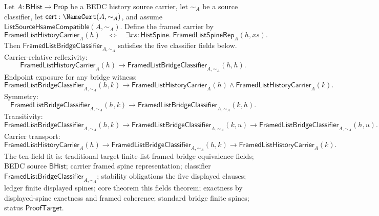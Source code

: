 \begin{theorem}
\label{thm:framed-list-bridge-classifier-equivalence-fields}
Let $A:\mathsf{BHist}\to\mathsf{Prop}$ be a BEDC history source carrier, let
$\sim_A$ be a source classifier, let $\mathsf{cert}:\NameCert(A,\sim_A)$, and
assume $\mathsf{ListSourceHsameCompatible}(A,\sim_A)$. Define the framed carrier
by
$$
\mathsf{FramedListHistoryCarrier}_A(h)
\quad\Longleftrightarrow\quad
\exists xs:\mathsf{HistSpine}.\;\mathsf{FramedListSpineRep}_A(h,xs).
$$
Then $\mathsf{FramedListBridgeClassifier}_{A,\sim_A}$ satisfies the five
classifier fields below. Carrier-relative reflexivity:
$$
\mathsf{FramedListHistoryCarrier}_A(h)\to
\mathsf{FramedListBridgeClassifier}_{A,\sim_A}(h,h).
$$
Endpoint exposure for any bridge witness:
$$
\mathsf{FramedListBridgeClassifier}_{A,\sim_A}(h,k)\to
\mathsf{FramedListHistoryCarrier}_A(h)\land
\mathsf{FramedListHistoryCarrier}_A(k).
$$
Symmetry:
$$
\mathsf{FramedListBridgeClassifier}_{A,\sim_A}(h,k)\to
\mathsf{FramedListBridgeClassifier}_{A,\sim_A}(k,h).
$$
Transitivity:
$$
\mathsf{FramedListBridgeClassifier}_{A,\sim_A}(h,k)\to
\mathsf{FramedListBridgeClassifier}_{A,\sim_A}(k,u)\to
\mathsf{FramedListBridgeClassifier}_{A,\sim_A}(h,u).
$$
Carrier transport:
$$
\mathsf{FramedListHistoryCarrier}_A(h)\to
\mathsf{FramedListBridgeClassifier}_{A,\sim_A}(h,k)\to
\mathsf{FramedListHistoryCarrier}_A(k).
$$
The ten-field fit is: traditional target finite-list framed bridge equivalence
fields; BEDC source $\mathsf{BHist}$; carrier framed spine representation;
classifier $\mathsf{FramedListBridgeClassifier}_{A,\sim_A}$; stability
obligations the five displayed clauses; ledger finite displayed spines; core
theorem this fields theorem; exactness by displayed-spine exactness and framed
coherence; standard bridge finite spines; status $\mathsf{ProofTarget}$.
\end{theorem}
